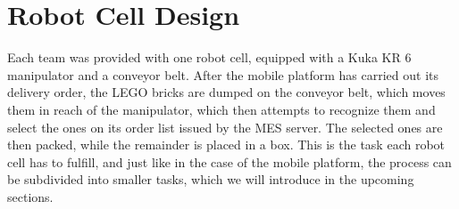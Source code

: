 \chapter{Robot Cell Design}\label{chap:robot_cell_chapter}

Each team was provided with one robot cell, equipped with a Kuka KR 6 manipulator and a conveyor belt. After the mobile platform has carried out its delivery order, the LEGO bricks are dumped on the conveyor belt, which moves them in reach of the manipulator, which then attempts to recognize them and select the ones on its order list issued by the MES server. The selected ones are then packed, while the remainder is placed in a box. This is the task each robot cell has to fulfill, and just like in the case of the mobile platform, the process can be subdivided into smaller tasks, which we will introduce in the upcoming sections.











